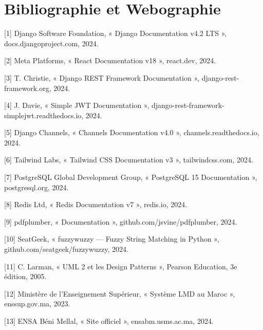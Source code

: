 \chapter*{Bibliographie et Webographie}

[1] Django Software Foundation, « Django Documentation v4.2 LTS », docs.djangoproject.com, 2024.

[2] Meta Platforms, « React Documentation v18 », react.dev, 2024.

[3] T. Christie, « Django REST Framework Documentation », django-rest-framework.org, 2024.

[4] J. Davie, « Simple JWT Documentation », django-rest-framework-simplejwt.readthedocs.io, 2024.

[5] Django Channels, « Channels Documentation v4.0 », channels.readthedocs.io, 2024.

[6] Tailwind Labs, « Tailwind CSS Documentation v3 », tailwindcss.com, 2024.

[7] PostgreSQL Global Development Group, « PostgreSQL 15 Documentation », postgresql.org, 2024.

[8] Redis Ltd, « Redis Documentation v7 », redis.io, 2024.

[9] pdfplumber, « Documentation », github.com/jsvine/pdfplumber, 2024.

[10] SeatGeek, « fuzzywuzzy — Fuzzy String Matching in Python », github.com/seatgeek/fuzzywuzzy, 2024.

[11] C. Larman, « UML 2 et les Design Patterns », Pearson Education, 3e édition, 2005.

[12] Ministère de l'Enseignement Supérieur, « Système LMD au Maroc », enssup.gov.ma, 2023.

[13] ENSA Béni Mellal, « Site officiel », ensabm.usms.ac.ma, 2024.


